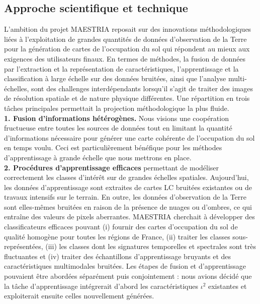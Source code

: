 \subsection{Approche scientifique et technique}
\label{subsec:wp}
L'ambition du projet MAESTRIA reposait sur des innovations méthodologiques liées à l'exploitation de grandes quantités de données d'observation de la Terre pour la génération de cartes de l'occupation du sol qui répondent au mieux aux exigences des utilisateurs finaux.
En termes de méthodes, la fusion de données par l'extraction et la représentation de caractéristiques, l'apprentissage et la classification à large échelle sur des données bruitées, ainsi que l'analyse multi-échelles, sont des challenges interdépendants lorsqu'il s'agit de traiter des images de résolution spatiale et de nature physique différentes. Une répartition en trois tâches principales permettait la projection méthodologique la plus fluide.\\

\textbf{1. Fusion d'informations hétérogènes.} Nous visions une coopération fructueuse entre toutes les sources de données tout en limitant la quantité d'informations nécessaire pour générer une carte cohérente de l'occupation du sol en temps voulu. Ceci est particulièrement bénéfique
pour les méthodes d'apprentissage à grande échelle que nous mettrons en place.\\

\textbf{2. Procédures d'apprentissage efficaces} permettant de modéliser correctement les classes d'intérêt sur de grandes échelles spatiales. Aujourd'hui, les données d'apprentissage sont extraites de cartes LC bruitées existantes ou de travaux intensifs sur le terrain. En outre, les données d'observation de la Terre sont elles-mêmes bruitées en raison de la présence de nuages ou d'ombres, ce qui entraîne des valeurs de pixels aberrantes. MAESTRIA cherchait à développer des classificateurs efficaces
pouvant (i) fournir des cartes d'occupation du sol de qualité homogène pour toutes les régions de France, (ii) traiter les classes sous-représentées, (iii) les classes dont les signatures temporelles et spectrales sont très fluctuantes et (iv) traiter des échantillons d'apprentissage bruyants et des caractéristiques multimodales bruitées. Les étapes de fusion et d'apprentissage
pouvaient être abordées séparément puis conjointement : nous avions décidé  que la tâche d'apprentissage intégrerait d'abord les caractéristiques $\iota^2$ existantes et exploiterait ensuite celles nouvellement générées.\\

